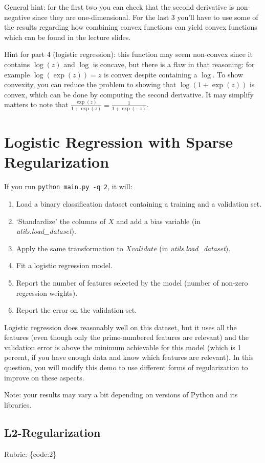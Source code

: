 \documentclass{article}
\def\rubric#1{\gre{Rubric: \{#1\}}}{}
\def\gre#1{{\color{gre}#1}}
\def\enum#1{\begin{enumerate}#1\end{enumerate}}
\begin{document}
General hint: for the first two you can check that the second derivative is non-negative since they are one-dimensional. For the last 3 you'll have to use some of the results regarding how combining convex functions can yield convex functions which can be found in the lecture slides.

Hint for part 4 (logistic regression): this function may seem non-convex since it contains $\log(z)$ and $\log$ is concave, but there is a flaw in that reasoning: for example $\log(\exp(z))=z$ is convex despite containing a $\log$. To show convexity, you can reduce the problem to showing that $\log(1+\exp(z))$ is convex, which can be done by computing the second derivative. It may simplify matters to note that $\frac{\exp(z)}{1+\exp(z)} = \frac{1}{1+\exp(-z)}$.


\section{Logistic Regression with Sparse Regularization}

If you run  \verb|python main.py -q 2|, it will:
\enum{
\item Load a binary classification dataset containing a training and a validation set.
\item `Standardize' the columns of $X$ and add a bias variable (in \emph{utils.load\_dataset}).
\item Apply the same transformation to $Xvalidate$ (in \emph{utils.load\_dataset}).
\item Fit a logistic regression model.
\item Report the number of features selected by the model (number of non-zero regression weights).
\item Report the error on the validation set.
}
Logistic regression does reasonably well on this dataset,
but it uses all the features (even though only the prime-numbered features are relevant)
and the validation error is above the minimum achievable for this model
(which is 1 percent, if you have enough data and know which features are relevant).
In this question, you will modify this demo to use different forms of regularization
 to improve on these aspects.

Note: your results may vary a bit depending on versions of Python and its libraries.


\subsection{L2-Regularization}
\rubric{code:2}
\end{document}
